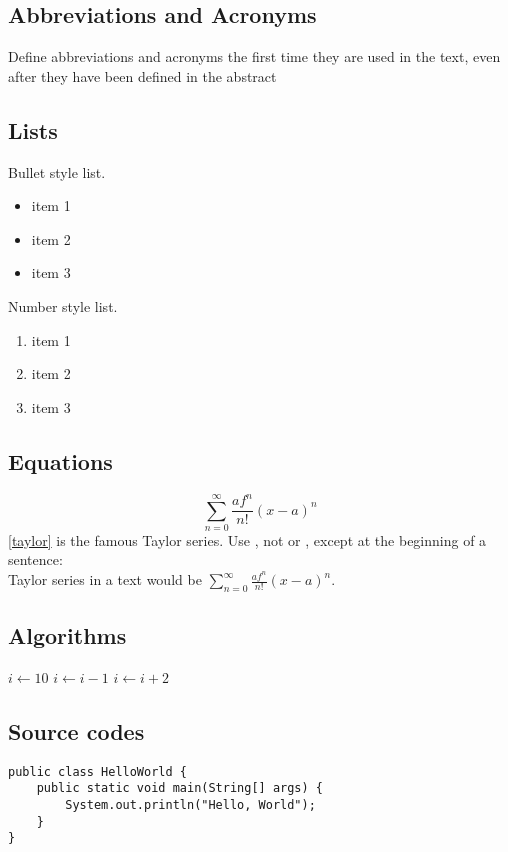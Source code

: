 \documentclass[conference]{IEEEtran}
\begin{document}
\subsection{Abbreviations and Acronyms}
    {Define abbreviations and acronyms the first time they are used in the text, even after they have been defined in the abstract}

\subsection{Lists}
Bullet style list.
\begin{itemize}
    \item item 1
    \item item 2
    \item item 3
\end{itemize}

Number style list.
\begin{enumerate}
    \item item 1
    \item item 2
    \item item 3
\end{enumerate}

\subsection{Equations}
    \begin{equation}
    \sum_{n=0}^{\infty} \frac{af^n}{n!}(x-a)^n
    \label{taylor}
    \end{equation}
    \eqref{taylor} is the famous Taylor series. Use , not  or , except at the beginning of a sentence: 
        {\\Taylor series in a text would be {$\sum_{n=0}^{\infty}\frac{af^n}{n!}(x-a)^n$}.}
    \subsection{Algorithms}
    \begin{algorithmic}
    \STATE $i\gets 10$
        \STATE $i\gets i-1$
    \ELSE
            \STATE $i\gets i+2$
        \ENDIF
    \ENDIF 
\end{algorithmic}

\subsection{Source codes}
\begin{verbatim}
public class HelloWorld {
    public static void main(String[] args) {
        System.out.println("Hello, World");
    }    
}
\end{verbatim}
\end{document}
